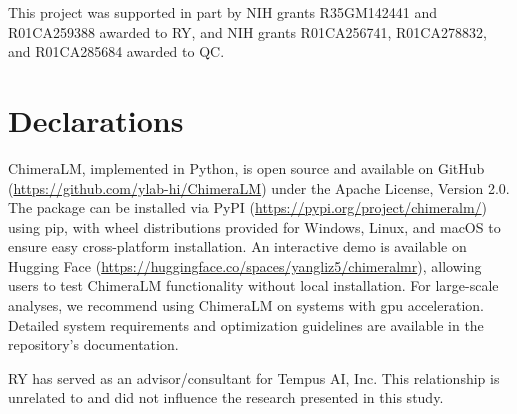 \documentclass[pdflatex,sn-nature]{sn-jnl}%
\theoremstyle{thmstyleone}%
\theoremstyle{thmstyletwo}%
\theoremstyle{thmstylethree}%
\begin{document}

This project was supported in part by NIH grants R35GM142441 and R01CA259388 awarded to RY, and NIH grants R01CA256741, R01CA278832, and R01CA285684 awarded to QC.

\section*{Declarations}




ChimeraLM, implemented in Python, is open source and available on GitHub (\url{https://github.com/ylab-hi/ChimeraLM}) under the Apache License, Version 2.0.
The package can be installed via PyPI (\url{https://pypi.org/project/chimeralm/}) using pip, with wheel distributions provided for Windows, Linux, and macOS to ensure easy cross-platform installation.
An interactive demo is available on Hugging Face (\url{https://huggingface.co/spaces/yangliz5/chimeralmr}), allowing users to test ChimeraLM functionality without local installation.
For large-scale analyses, we recommend using ChimeraLM on systems with \gls{gpu} acceleration. Detailed system requirements and optimization guidelines are available in the repository's documentation.


RY has served as an advisor/consultant for Tempus AI, Inc. This relationship is unrelated to and did not influence the research presented in this study.


%
\end{document}
